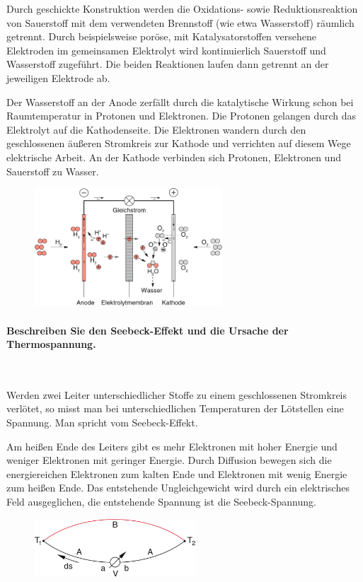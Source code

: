\documentclass[a4paper, 11pt, ngerman, parskip=half-]{scrartcl}
\begin{document}
Durch geschickte Konstruktion werden die Oxidations- sowie Reduktionsreaktion von Sauerstoff mit dem
verwendeten Brennstoff (wie etwa Wasserstoff) räumlich getrennt. Durch beispielsweise poröse, mit
Katalysatorstoffen versehene Elektroden im gemeinsamen Elektrolyt wird kontinuierlich Sauerstoff und
Wasserstoff zugeführt. Die beiden Reaktionen laufen dann getrennt an der jeweiligen Elektrode ab.

Der Wasserstoff an der Anode zerfällt durch die katalytische Wirkung schon bei Raumtemperatur in
Protonen und Elektronen. Die Protonen gelangen durch das Elektrolyt auf die Kathodenseite. Die
Elektronen wandern durch den geschlossenen äußeren Stromkreis zur Kathode und verrichten auf diesem
Wege elektrische Arbeit. An der Kathode verbinden sich Protonen, Elektronen und Sauerstoff zu
Wasser.

\begin{figure}[H]
    \centering
    \includegraphics[width=7cm]{image/04/2}
\end{figure}

\paragraph{Beschreiben Sie den Seebeck-Effekt und die Ursache der Thermospannung.} ~

Werden zwei Leiter unterschiedlicher Stoffe zu einem geschlossenen Stromkreis verlötet, so misst man
bei unterschiedlichen Temperaturen der Lötstellen eine Spannung. Man spricht vom Seebeck-Effekt.

Am heißen Ende des Leiters gibt es mehr Elektronen mit hoher Energie und weniger Elektronen mit
geringer Energie. Durch Diffusion bewegen sich die energiereichen Elektronen zum kalten Ende und
Elektronen mit wenig Energie zum heißen Ende. Das entstehende Ungleichgewicht wird durch ein
elektrisches Feld ausgeglichen, die entstehende Spannung ist die Seebeck-Spannung.

\begin{figure}[H]
    \centering
    \includegraphics[width=6cm]{image/04/3}
\end{figure}
\end{document}
